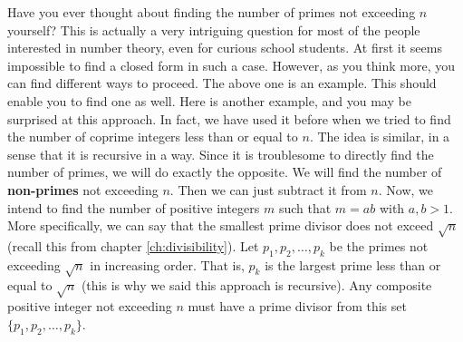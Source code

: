 \documentclass{subfiles}
\begin{document}
		Have you ever thought about finding the number of primes not exceeding $n$ yourself? This is actually a very intriguing question for most of the people interested in number theory, even for curious school students. At first it seems impossible to find a closed form in such a case. However, as you think more, you can find different ways to proceed. The above one is an example. This should enable you to find one as well. Here is another example, and you may be surprised at this approach. In fact, we have used it before when we tried to find the number of coprime integers less than or equal to $n$. The idea is similar, in a sense that it is recursive in a way. Since it is troublesome to directly find the number of primes, we will do exactly the opposite. We will find the number of \textbf{non-primes} not exceeding $n$. Then we can just subtract it from $n$. Now, we intend to find the number of positive integers $m$ such that $m=ab$ with $a,b>1$. More specifically, we can say that the smallest prime divisor does not exceed $\sqrt{n}$ (recall this from chapter \eqref{ch:divisibility}). Let $p_1,p_2,\ldots,p_k$ be the primes not exceeding $\sqrt{n}$ in increasing order. That is, $p_k$ is the largest prime less than or equal to $\sqrt{n}$ (this is why we said this approach is recursive). Any composite positive integer not exceeding $n$ must have a prime divisor from this set $\{p_1,p_2,\ldots,p_k\}$.
		
\end{document}
